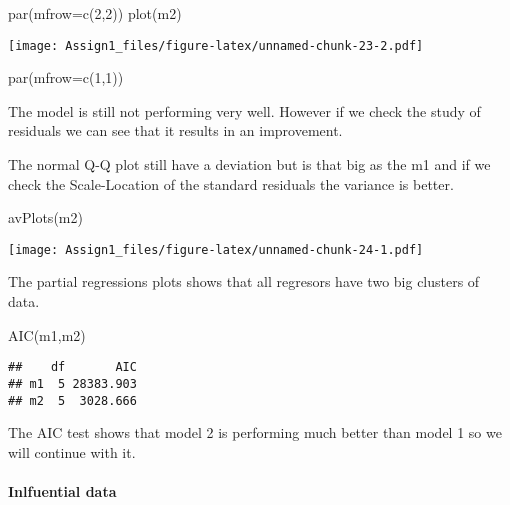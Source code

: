 \documentclass[
]{article}
\newenvironment{Shaded}{\begin{snugshade}}{\end{snugshade}}
\newcommand{\AttributeTok}[1]{\textcolor[rgb]{0.77,0.63,0.00}{#1}}
\newcommand{\DecValTok}[1]{\textcolor[rgb]{0.00,0.00,0.81}{#1}}
\newcommand{\FunctionTok}[1]{\textcolor[rgb]{0.00,0.00,0.00}{#1}}
\newcommand{\NormalTok}[1]{#1}
\begin{document}
\begin{Shaded}
\begin{Highlighting}[]
\FunctionTok{par}\NormalTok{(}\AttributeTok{mfrow=}\FunctionTok{c}\NormalTok{(}\DecValTok{2}\NormalTok{,}\DecValTok{2}\NormalTok{))}
\FunctionTok{plot}\NormalTok{(m2)}
\end{Highlighting}
\end{Shaded}

\texttt{[image: Assign1\_files/figure-latex/unnamed-chunk-23-2.pdf]}

\begin{Shaded}
\begin{Highlighting}[]
\FunctionTok{par}\NormalTok{(}\AttributeTok{mfrow=}\FunctionTok{c}\NormalTok{(}\DecValTok{1}\NormalTok{,}\DecValTok{1}\NormalTok{))}
\end{Highlighting}
\end{Shaded}

The model is still not performing very well. However if we check the
study of residuals we can see that it results in an improvement.

The normal Q-Q plot still have a deviation but is that big as the m1 and
if we check the Scale-Location of the standard residuals the variance is
better.

\begin{Shaded}
\begin{Highlighting}[]
\FunctionTok{avPlots}\NormalTok{(m2)}
\end{Highlighting}
\end{Shaded}

\texttt{[image: Assign1\_files/figure-latex/unnamed-chunk-24-1.pdf]}

The partial regressions plots shows that all regresors have two big
clusters of data.

\begin{Shaded}
\begin{Highlighting}[]
\FunctionTok{AIC}\NormalTok{(m1,m2)}
\end{Highlighting}
\end{Shaded}

\begin{verbatim}
##    df       AIC
## m1  5 28383.903
## m2  5  3028.666
\end{verbatim}

The AIC test shows that model 2 is performing much better than model 1
so we will continue with it.

\hypertarget{inlfuential-data}{%
\paragraph{Inlfuential data}\label{inlfuential-data}}
\end{document}
